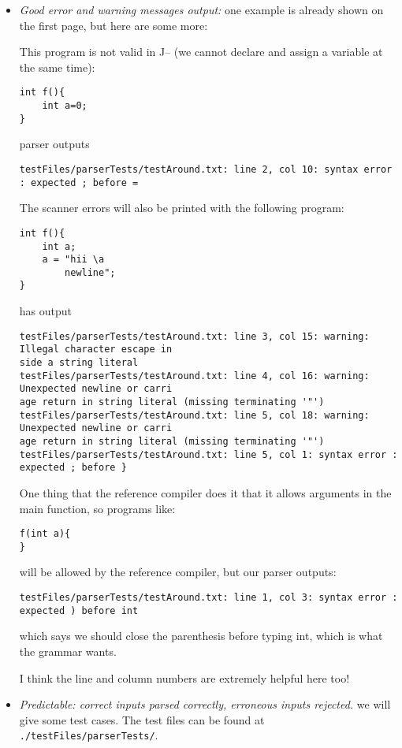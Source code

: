 \documentclass{article}
\begin{document}
\begin{itemize}
    \item \emph{Good error and warning messages output:} one example is already shown on the first page, but here are some more:

        This program is not valid in J-- (we cannot declare and assign a variable at the same time):
        \begin{verbatim}
int f(){
    int a=0;
}
        \end{verbatim}
        parser outputs
        \begin{verbatim}
testFiles/parserTests/testAround.txt: line 2, col 10: syntax error : expected ; before =
        \end{verbatim}

        The scanner errors will also be printed with the following program:
        \begin{verbatim}
int f(){
    int a;
    a = "hii \a
        newline";
}
        \end{verbatim}
        has output
        \begin{verbatim}
testFiles/parserTests/testAround.txt: line 3, col 15: warning: Illegal character escape in
side a string literal
testFiles/parserTests/testAround.txt: line 4, col 16: warning: Unexpected newline or carri
age return in string literal (missing terminating '"')
testFiles/parserTests/testAround.txt: line 5, col 18: warning: Unexpected newline or carri
age return in string literal (missing terminating '"')
testFiles/parserTests/testAround.txt: line 5, col 1: syntax error : expected ; before }
        \end{verbatim}

        One thing that the reference compiler does it that it allows arguments in the main function, so programs like:
        \begin{verbatim}
f(int a){
}
        \end{verbatim}
        will be allowed by the reference compiler, but our parser outputs:
        \begin{verbatim}
testFiles/parserTests/testAround.txt: line 1, col 3: syntax error : expected ) before int
        \end{verbatim}
        which says we should close the parenthesis before typing int, which is what the grammar wants.

        I think the line and  column numbers are extremely helpful here too!
    \item \emph{Predictable: correct inputs parsed correctly, erroneous inputs rejected. }
        we will give some test cases. The test files can be found at \verb|./testFiles/parserTests/|.


\end{itemize}
\end{document}
